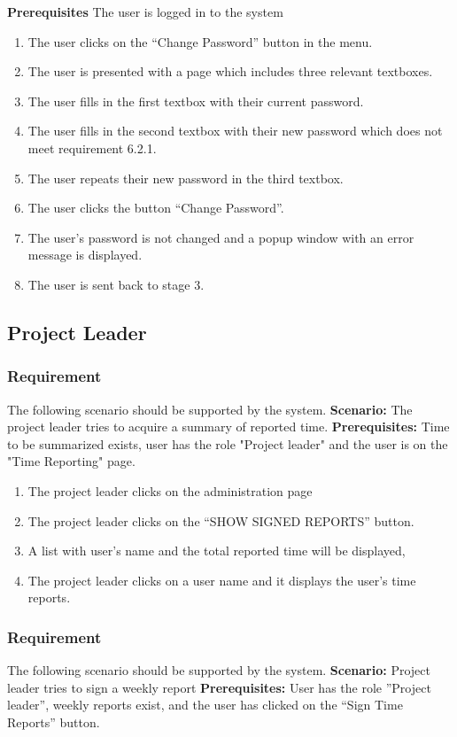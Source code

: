 \documentclass{article}
\begin{document}
\textbf{Prerequisites} The user is logged in to the system

\begin{enumerate}
    \item The user clicks on the “Change Password” button in the menu.
    \item The user is presented with a page which includes three relevant textboxes.
    \item The user fills in the first textbox with their current password.
    \item The user fills in the second textbox with their new password which does not meet requirement 6.2.1.
    \item The user repeats their new password in the third textbox.
    \item The user clicks the button “Change Password”.
    \item The user's password is not changed and a popup window with an error message is displayed.
    \item The user is sent back to stage 3.
\end{enumerate}

\subsection{Project Leader}
\subsubsection{Requirement}
The following scenario should be supported by the system.
\textbf{Scenario:} The project leader tries to acquire a summary of reported time.
\textbf{Prerequisites:} Time to be summarized exists, user has the role "Project leader" and the user is on the "Time Reporting" page.

\begin{enumerate}
    \item The project leader clicks on the administration page 
    \item The project leader clicks on the “SHOW SIGNED REPORTS” button.
    \item A list with user’s name and the total reported time will be displayed,
    \item The project leader clicks on a user name and it displays the user’s time reports.
\end{enumerate}
\subsubsection{Requirement}
The following scenario should be supported by the system.
\textbf{Scenario:} Project leader tries to sign a weekly report
\textbf{Prerequisites:} User has the role ”Project leader”, weekly reports exist, and the user has clicked on the “Sign Time Reports” button.
\end{document}
